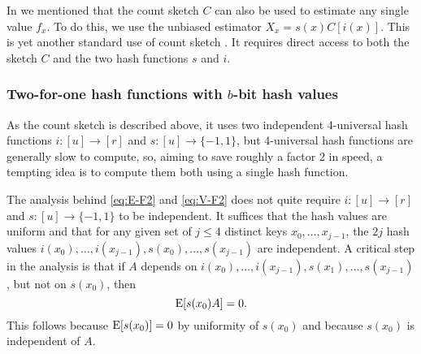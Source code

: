 In  we mentioned that the count sketch $C$ can also
be used to estimate any single value $f_x$. To do this, we use
the unbiased estimator $X_x=s(x)C[i(x)]$. This is yet another standard use
of count sketch \cite{charikar04count-sketch}. It requires
direct access to both the sketch $C$ and the two hash functions $s$ and $i$.

\subsubsection{Two-for-one hash functions with \texorpdfstring{$b$}{b}-bit hash values}
As the count sketch is described above,
it uses two independent 4-universal hash functions
$i:[u]\to[r]$ and $s:[u]\to\{-1,1\}$, but 4-universal hash functions
are generally slow to compute, so, aiming to save roughly a factor 2
in speed, a tempting idea is to compute them both using a single hash
function.

The analysis behind \eqref{eq:E-F2} and \eqref{eq:V-F2} does not quite
require $i:[u]\to[r]$ and $s:[u]\to\{-1,1\}$ to be independent.
It suffices that the hash values are uniform and that for any
given set of $j\leq 4$ distinct keys $x_0,\ldots,x_{j - 1}$, the $2j$ hash
values $i(x_0),\ldots,i(x_{j - 1}),s(x_0),\ldots,s(x_{j - 1})$ are independent.
A critical step in the analysis is that if
$A$ depends on $i(x_0),\ldots,i(x_{j - 1}),s(x_1),\ldots,s(x_{j - 1})$, but
not on $s(x_0)$, then
\begin{equation}\label{eq:E-0}
  \operatorname*{E}[s(x_0) A] = 0 .
\end{equation}
This follows because $\operatorname*{E}[s(x_0)]=0$ by uniformity of $s(x_0)$ and because $s(x_0)$ is independent of $A$.


